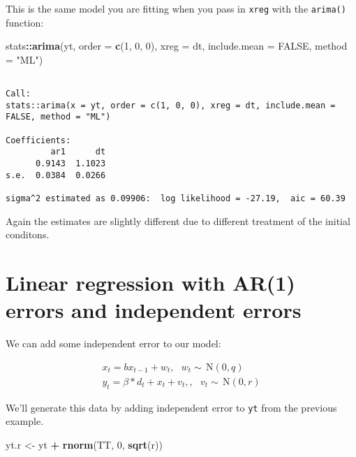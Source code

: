 \documentclass[12pt,]{book}
\newenvironment{Shaded}{\begin{snugshade}}{\end{snugshade}}
\newcommand{\DataTypeTok}[1]{\textcolor[rgb]{0.13,0.29,0.53}{#1}}
\newcommand{\DecValTok}[1]{\textcolor[rgb]{0.00,0.00,0.81}{#1}}
\newcommand{\KeywordTok}[1]{\textcolor[rgb]{0.13,0.29,0.53}{\textbf{#1}}}
\newcommand{\NormalTok}[1]{#1}
\newcommand{\OperatorTok}[1]{\textcolor[rgb]{0.81,0.36,0.00}{\textbf{#1}}}
\newcommand{\OtherTok}[1]{\textcolor[rgb]{0.56,0.35,0.01}{#1}}
\newcommand{\StringTok}[1]{\textcolor[rgb]{0.31,0.60,0.02}{#1}}
\begin{document}
This is the same model you are fitting when you pass in \texttt{xreg} with the \texttt{arima()} function:

\begin{Shaded}
\begin{Highlighting}[]
\NormalTok{stats}\OperatorTok{::}\KeywordTok{arima}\NormalTok{(yt, }\DataTypeTok{order =} \KeywordTok{c}\NormalTok{(}\DecValTok{1}\NormalTok{, }\DecValTok{0}\NormalTok{, }\DecValTok{0}\NormalTok{), }\DataTypeTok{xreg =}\NormalTok{ dt, }\DataTypeTok{include.mean =} \OtherTok{FALSE}\NormalTok{, }
    \DataTypeTok{method =} \StringTok{"ML"}\NormalTok{)}
\end{Highlighting}
\end{Shaded}

\begin{verbatim}

Call:
stats::arima(x = yt, order = c(1, 0, 0), xreg = dt, include.mean = FALSE, method = "ML")

Coefficients:
         ar1      dt
      0.9143  1.1023
s.e.  0.0384  0.0266

sigma^2 estimated as 0.09906:  log likelihood = -27.19,  aic = 60.39
\end{verbatim}

Again the estimates are slightly different due to different treatment of the initial conditons.

\hypertarget{linear-regression-with-ar1-errors-and-independent-errors}{%
\section{Linear regression with AR(1) errors and independent errors}\label{linear-regression-with-ar1-errors-and-independent-errors}}

We can add some independent error to our model:

\begin{equation}
\begin{gathered}
x_{t} = bx_{t-1} + w_{t}, \text{ } w_t \sim \,\text{N}(0,q)  \\
y_{t} = \beta*d_t + x_{t} + v_t, , \text{ } v_t \sim \,\text{N}(0,r)  
\end{gathered}
\label{eq:short-lr-ar1-r}
\end{equation}

We'll generate this data by adding independent error to \texttt{yt} from the previous example.

\begin{Shaded}
\begin{Highlighting}[]
\NormalTok{yt.r <-}\StringTok{ }\NormalTok{yt }\OperatorTok{+}\StringTok{ }\KeywordTok{rnorm}\NormalTok{(TT, }\DecValTok{0}\NormalTok{, }\KeywordTok{sqrt}\NormalTok{(r))}
\end{Highlighting}
\end{Shaded}
\end{document}
